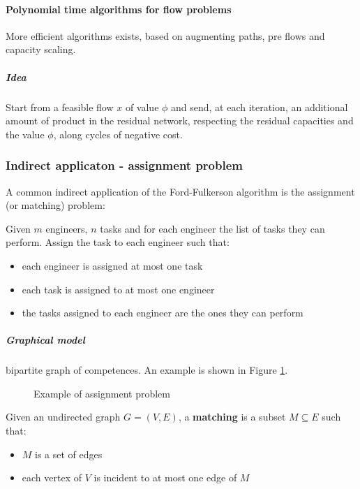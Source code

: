 \documentclass[english]{article}
\begin{document}
\paragraph{Polynomial time algorithms for flow problems}

More efficient algorithms exists, based on augmenting paths, pre flows and capacity scaling.

\subparagraph*{Idea}
Start from a feasible flow \(x\) of value \(\phi\) and send, at each iteration, an additional amount of product in the residual network, respecting the residual capacities and the value \(\phi\), along cycles of negative cost.

\subsubsection{Indirect applicaton - assignment problem}

A common indirect application of the Ford-Fulkerson algorithm is the assignment (or matching) problem:

Given \(m\) engineers, \(n\) tasks and for each engineer the list of tasks they can perform.
Assign the task to each engineer such that:

\begin{itemize}
  \item each engineer is assigned at most one task
  \item each task is assigned to at most one engineer
  \item the tasks assigned to each engineer are the ones they can perform
\end{itemize}

\subparagraph*{Graphical model}
bipartite graph of competences.
An example is shown in Figure \ref{fig:assignment-example}.

\begin{figure}[htbp]
  \bigskip
  \centering
  \caption{Example of assignment problem}
  \label{fig:assignment-example}
  \bigskip
\end{figure}

\bigskip
\begin{definition}[Matching]
  Given an undirected graph \(G = \left( V, E \right)\), a \textbf{matching} is a subset \(M \subseteq E\) such that:
  \begin{itemize}
    \item \(M\) is a set of edges
    \item each vertex of \(V\) is incident to at most one edge of \(M\)
  \end{itemize}
  \label{def:matching}
\end{definition}
\end{document}
